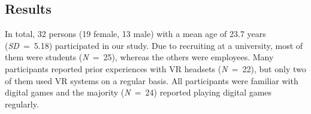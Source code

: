 \documentclass{sigchi}
\begin{document}
\subsection{Results}

In total, 32 persons (19 female, 13 male) with a mean age of 23.7 years (\textit{SD}~=~5.18) participated in our study. Due to recruiting at a university, most of them were students (\textit{N}~=~25), whereas the others were employees. Many participants reported prior experiences with VR headsets (\textit{N}~=~22), but only two of them used VR systems on a regular basis. All participants were familiar with digital games and the majority (\textit{N}~=~24) reported playing digital games regularly.

\end{document}
